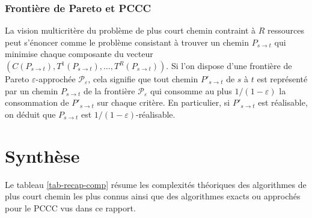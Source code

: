\documentclass[10pt,francais]{llncs}
\begin{document}
{\subsubsection{Fronti\`ere de Pareto et PCCC}\label{subsub-approx-multiobj-p3c}
La vision multicrit\`ere du probl\`eme de plus court chemin contraint \`a $R$ ressources peut s'\'enoncer comme le probl\`eme consistant \`a trouver un chemin $P_{s \to t}$ qui minimise chaque composante du vecteur $\left(C(P_{s \to t}),T^1(P_{s \to t}),\ldots,T^{R}(P_{s \to t})\right)$. Si l'on dispose d'une fronti\`ere de Pareto $\varepsilon$-approch\'ee $\mathscr{P}_\varepsilon$, cela signifie que tout chemin $P'_{s \to t}$ de $s$ \`a $t$ est repr\'esent\'e par un chemin $P_{s \to t}$ de la fronti\`ere $\mathscr{P}_\varepsilon$ qui consomme au plus $1/(1-\varepsilon)$ la consommation de $P'_{s \to t}$ sur chaque crit\`ere. En particulier, si $P'_{s \to t}$ est r\'ealisable, on d\'eduit que $P_{s \to t}$ est $1/(1-\varepsilon)$-r\'ealisable. 

\section{Synth\`ese}\label{sec-conc}

Le tableau \ref{tab-recap-comp} r\'esume les complexit\'es th\'eoriques des algorithmes de plus court chemin les plus connus ainsi que des algorithmes exacts ou approch\'es pour le PCCC vus dans ce rapport.
\begin{table}
\center


\end{table}}
\end{document}
